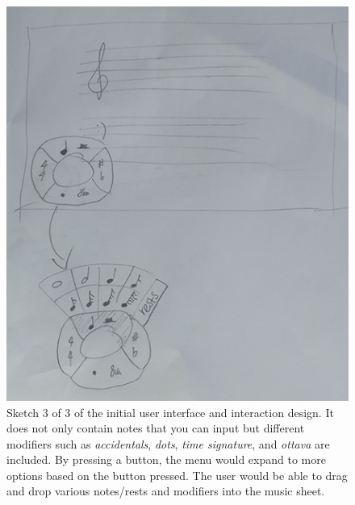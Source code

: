 			\begin{figure}[H]
				\centering
				\includegraphics[scale=0.3]{figures/initial-sketches-3.png}
			    \caption{Sketch 3 of 3 of the initial user interface and interaction design. It does not only contain notes that you can input but different modifiers such as \textit{accidentals}, \textit{dots}, \textit{time signature}, and \textit{ottava} are included. By pressing a button, the menu would expand to more options based on the button pressed. The user would be able to drag and drop various notes/rests and modifiers into the music sheet.}
			    \label{fig:initial_sketches_3}
			\end{figure}


